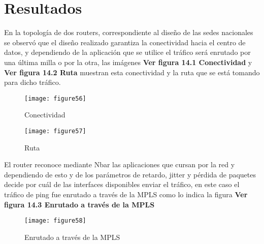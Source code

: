 \chapter{Resultados}
\label{cha:Resultados}

En la topología de dos routers, correspondiente al diseño de las sedes nacionales se observó que el diseño realizado garantiza la conectividad hacia el centro de datos, y dependiendo de la aplicación que se utilice el tráfico será enrutado por una última milla o por la otra, las imágenes  \textbf{Ver figura 14.1 Conectividad} y  \textbf{Ver figura 14.2  Ruta} muestran esta conectividad y la ruta que se está tomando para dicho tráfico. 

\begin{figure}[htbp]
  \centering
    {\texttt{[image: figure56]}}%
  \caption{ Conectividad}
  \label{fig:fig2subfig}
\end{figure}

\begin{figure}[htbp]
  \centering
    {\texttt{[image: figure57]}}%
  \caption{ Ruta}
  \label{fig:fig2subfig}
\end{figure}

El router reconoce mediante Nbar las aplicaciones que cursan por la red y dependiendo de esto y de los parámetros de retardo, jitter y pérdida de paquetes decide por cuál de las interfaces disponibles enviar el tráfico, en este caso el tráfico de ping fue enrutado a través de la MPLS como lo indica la figura \textbf{Ver figura 14.3 Enrutado a través de la MPLS}

\begin{figure}[htbp]
  \centering
    {\texttt{[image: figure58]}}%
  \caption{ Enrutado a través de la MPLS}
  \label{fig:fig2subfig}
\end{figure}


